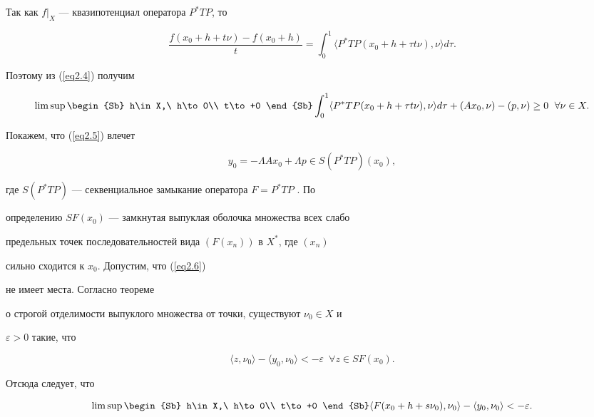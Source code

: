Так как $f|_X$ --- квазипотенциал оператора $P^*TP$, то


$$


\frac{f(x_0+h+t\nu )-f(x_0+h)}{t} =


\int_0^1 \langle P^*TP (x_0+h+\tau t\nu ),\nu \rangle d\tau.


$$


Поэтому из (\ref{eq2.4}) получим


\begin{equation}


\limsup\begin{Sb} h\in X,\ h\to 0\\ t\to +0 \end{Sb}


\int_0^1 \langle P^*TP (x_0+h+\tau t \nu ),\nu


\rangle d\tau +(Ax_0,\nu )-(p,\nu )\ge 0\ \; \forall\nu\in X.


\label{eq2.5}


\end{equation}


Покажем, что (\ref{eq2.5}) влечет


\begin{equation}


y_0=-\Lambda Ax_0+\Lambda p\in S(P^*TP)(x_0),


\label{eq2.6}


\end{equation}


где $S(P^*TP)$ --- секвенциальное замыкание оператора $F=P^*TP$ \cite{n17}. По


определению $SF(x_0)$ --- замкнутая выпуклая оболочка множества всех слабо


предельных точек последовательностей вида $(F(x_n))$ в $X^*$, где $(x_n)$


сильно сходится к $x_0$. Допустим, что (\ref{eq2.6})


не имеет места. Согласно теореме


о строгой отделимости выпуклого множества от точки, существуют $\nu_0\in X$ и


$\varepsilon >0$ такие, что


$$


\langle z,\nu_0 \rangle -


\langle y_0,\nu_0 \rangle <-\varepsilon\ \;\forall z\in SF(x_0).


$$


Отсюда следует, что


\begin{equation}


\limsup\begin{Sb} h\in X,\ h\to 0\\ t\to +0  \end{Sb}


\langle F(x_0+h+s\nu_0),\nu_0 \rangle -


\langle y_0,\nu_0 \rangle <-\varepsilon.


\label{eq2.7}


\end{equation}


